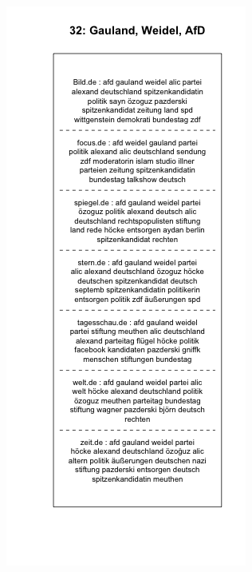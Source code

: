 \documentclass[12pt,a4paper,notitlepage]{article}
\begin{document}
\begin{figure}[H]
\begin{center}
\begin{subfigure}[normla]{0.49\textwidth}
		\end{subfigure}
		\begin{subfigure}[normla]{0.49\textwidth}
			\includegraphics[width=\textwidth]{../figs/plotquote32.png}
		\end{subfigure}
	\end{center}
\end{figure}
\end{document}
